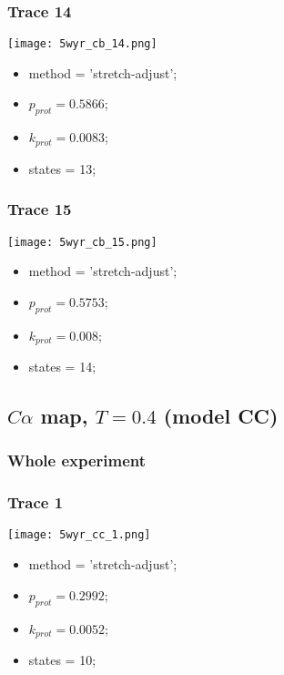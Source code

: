 \subsubsection{Trace 14}
\begin{minipage}[c]{0.7\textwidth}
    \texttt{[image: 5wyr\_cb\_14.png]}
\end{minipage}
\hfill
\begin{minipage}[c]{0.45\textwidth}
    \begin{itemize}
        \item method = 'stretch-adjust';
        \item $p_{prot}=0.5866$;
        \item $k_{prot}=0.0083$;
        \item states = 13;
    \end{itemize}
\end{minipage}

\subsubsection{Trace 15}
\begin{minipage}[c]{0.7\textwidth}
    \texttt{[image: 5wyr\_cb\_15.png]}
\end{minipage}
\hfill
\begin{minipage}[c]{0.45\textwidth}
    \begin{itemize}
        \item method = 'stretch-adjust';
        \item $p_{prot}=0.5753$;
        \item $k_{prot}=0.008$;
        \item states = 14;
    \end{itemize}
\end{minipage}

\subsection{$C\alpha$ map, $T=0.4$ (model CC)}
\subsubsection{Whole experiment}

\subsubsection{Trace 1}
\begin{minipage}[c]{0.7\textwidth}
    \texttt{[image: 5wyr\_cc\_1.png]}
\end{minipage}
\hfill
\begin{minipage}[c]{0.45\textwidth}
    \begin{itemize}
        \item method = 'stretch-adjust';
        \item $p_{prot}=0.2992$;
        \item $k_{prot}=0.0052$;
        \item states = 10;
    \end{itemize}
\end{minipage}

